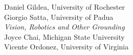                                     \hspace*{0.2in} Daniel Gildea, University of Rochester \\
                                    \hspace*{0.2in} Giorgio Satta, University of Padua \\
                            \emph{Vision, Robotics and Other Grounding} \\
                                    \hspace*{0.2in} Joyce Chai, Michigan State University \\
                                    \hspace*{0.2in} Vicente Ordonez, University of Virginia \\
